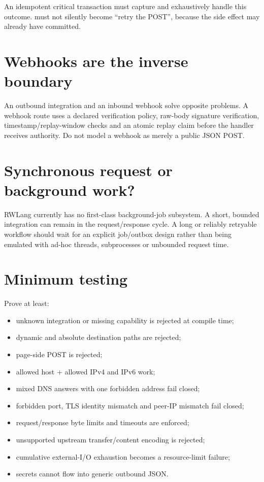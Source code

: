 An idempotent critical transaction must capture and exhaustively handle this outcome.  must not silently become ``retry the POST'', because the side effect may already have committed.

\section{Webhooks are the inverse boundary}

An outbound integration and an inbound webhook solve opposite problems. A webhook route uses a declared verification policy, raw-body signature verification, timestamp/replay-window checks and an atomic replay claim before the handler receives authority. Do not model a webhook as merely a public JSON POST.

\section{Synchronous request or background work?}

RWLang currently has no first-class background-job subsystem. A short, bounded integration can remain in the request/response cycle. A long or reliably retryable workflow should wait for an explicit job/outbox design rather than being emulated with ad-hoc threads, subprocesses or unbounded request time.

\section{Minimum testing}

Prove at least:

\begin{itemize}
  \item unknown integration or missing  capability is rejected at compile time;
  \item dynamic and absolute destination paths are rejected;
  \item page-side POST is rejected;
  \item allowed host + allowed IPv4 and IPv6 work;
  \item mixed DNS answers with one forbidden address fail closed;
  \item forbidden port, TLS identity mismatch and peer-IP mismatch fail closed;
  \item request/response byte limits and timeouts are enforced;
  \item unsupported upstream transfer/content encoding is rejected;
  \item cumulative external-I/O exhaustion becomes a resource-limit failure;
  \item secrets cannot flow into generic outbound JSON.
\end{itemize}

